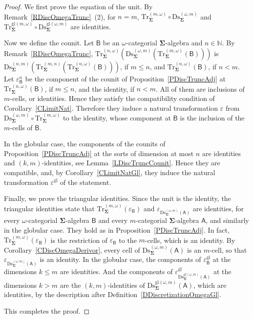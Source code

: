 \documentclass[a4paper, reqno
]{amsart}
\newcommand{\sig}[1]{\mathbf{#1}}             %
\newcommand{\calg}[1]{\boldsymbol{\mathsf{#1}}} %
\newcommand{\gl}{\mathrm{gl}}                %
\newcommand{\Ds}{\mathrm{Ds}}
\newcommand{\Tr}{\mathrm{Tr}}
\theoremstyle{plain}
\theoremstyle{definition}
\begin{document}
\begin{proof}
We first prove the equation of the unit.
By Remark~\ref{RDiscOmegaTrunc}~(2), for $n=m$, $\Tr^{(m,\omega)}_{\sig{\Sigma}}\circ\Ds^{(\omega,m)}_{\sig{\Sigma}}$ and $\Tr^{\gl(m,\omega)}_{\sig{\Sigma}}\circ\Ds^{\gl(\omega,m)}_{\sig{\Sigma}}$ are identities.

Now we define the counit.
Let $\calg{B}$ be an $\omega$-categorial $\sig{\Sigma}$-algebra and $n\in\mathbb{N}$.
By Remark~\ref{RDiscOmegaTrunc}, $\Tr^{(n,\omega)}_{\sig{\Sigma}}(\Ds^{(\omega,m)}_{\sig{\Sigma}}(\Tr^{(m,\omega)}_{\sig{\Sigma}}(\calg{B})))$ is $\Ds^{(n,m)}_{\sig{\Sigma}}(\Tr^{(m,n)}_{\sig{\Sigma}}(\Tr^{(n,\omega)}_{\sig{\Sigma}}(\calg{B})))$, if $m\leq n$, and $\Tr^{(n,\omega)}_{\sig{\Sigma}}(\calg{B})$, if $n<m$.
Let $\varepsilon^{n}_{\calg{B}}$ be the component of the counit of Proposition~\ref{PDiscTruncAdj} at $\Tr^{(n,\omega)}_{\sig{\Sigma}}(\calg{B})$, if $m\leq n$, and the identity, if $n<m$.
All of them are inclusions of $m$-cells, or identities.
Hence they satisfy the compatibility condition of Corollary~\ref{CLimitNat}.
Therefore they induce a natural transformation $\varepsilon$ from $\Ds^{(\omega,m)}_{\sig{\Sigma}}\circ\Tr^{(m,\omega)}_{\sig{\Sigma}}$ to the identity, whose component at $\calg{B}$ is the inclusion of the $m$-cells of $\calg{B}$.

In the globular case, the components of the counits of Proposition~\ref{PDiscTruncAdj} at the sorts of dimension at most $n$ are identities and $(k,m)$-identities, see Lemma~\ref{LDiscTruncCounit}.
Hence they are compatible, and, by Corollary~\ref{CLimitNatGl}, they induce the natural transformation $\varepsilon^{\gl}$ of the statement.

Finally, we prove the triangular identities.
Since the unit is the identity, the triangular identities state that $\Tr^{(m,\omega)}_{\sig{\Sigma}}(\varepsilon_{\calg{B}})$ and $\varepsilon_{\Ds^{(\omega,m)}_{\sig{\Sigma}}(\calg{A})}$ are identities, for every $\omega$-categorial $\sig{\Sigma}$-algebra $\calg{B}$ and every $m$-categorial $\sig{\Sigma}$-algebra $\calg{A}$, and similarly in the globular case.
They hold as in Proposition~\ref{PDiscTruncAdj}.
In fact, $\Tr^{(m,\omega)}_{\sig{\Sigma}}(\varepsilon_{\calg{B}})$ is the restriction of $\varepsilon_{\calg{B}}$ to the $m$-cells, which is an identity.
By Corollary~\ref{CDiscOmegaDerivor}, every cell of $\Ds^{(\omega,m)}_{\sig{\Sigma}}(\calg{A})$ is an $m$-cell, so that $\varepsilon_{\Ds^{(\omega,m)}_{\sig{\Sigma}}(\calg{A})}$ is an identity.
In the globular case, the components of $\varepsilon^{\gl}_{\calg{B}}$ at the dimensions $k\leq m$ are identities.
And the components of $\varepsilon^{\gl}_{\Ds^{\gl(\omega,m)}_{\sig{\Sigma}}(\calg{A})}$ at the dimensions $k>m$ are the $(k,m)$-identities of $\Ds^{\gl(\omega,m)}_{\sig{\Sigma}}(\calg{A})$, which are identities, by the description after Definition~\ref{DDiscretizationOmegaGl}.

This completes the proof.
\end{proof}
\end{document}
